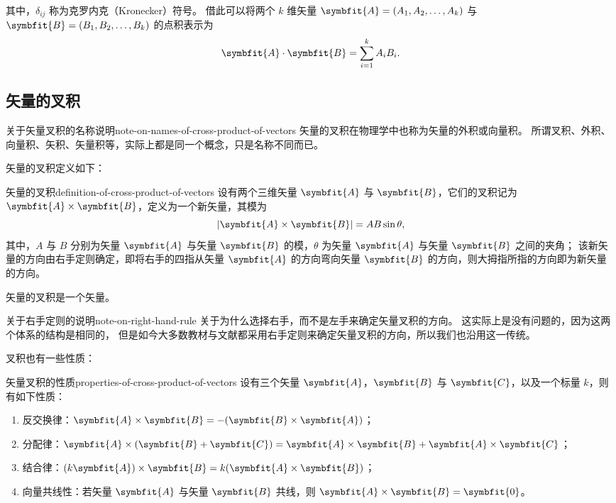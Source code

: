 其中，$ \delta_{ij} $ 称为克罗内克（Kronecker）符号。
借此可以将两个 $ k $ 维矢量 $ \symbfit{A} = (A_1 , A_2 , \ldots , A_k) $ 与 $ \symbfit{B} = (B_1 , B_2 , \ldots , B_k) $ 的点积表示为
\begin{equation}
    \symbfit{A} \cdot \symbfit{B} = \sum_{i=1}^{k} A_i B_i .
\end{equation}

\subsection{矢量的叉积}\label{subsec:cross-product-of-vectors}
\begin{note}{关于矢量叉积的名称说明}{note-on-names-of-cross-product-of-vectors}
    矢量的叉积在物理学中也称为矢量的外积或向量积。
    所谓叉积、外积、向量积、矢积、矢量积等，实际上都是同一个概念，只是名称不同而已。
\end{note}
矢量的叉积定义如下：
\begin{definition}{矢量的叉积}{definition-of-cross-product-of-vectors}
    设有两个三维矢量 $ \symbfit{A} $ 与 $ \symbfit{B} $，它们的叉积记为 $ \symbfit{A} \times \symbfit{B} $，定义为一个新矢量，其模为
    \begin{equation}
        |\symbfit{A} \times \symbfit{B}| = AB \sin \theta ,
    \end{equation}
    其中，$ A $ 与 $ B $ 分别为矢量 $ \symbfit{A} $ 与矢量 $ \symbfit{B} $ 的模，$ \theta $ 为矢量 $ \symbfit{A} $ 与矢量 $ \symbfit{B} $ 之间的夹角；
    该新矢量的方向由右手定则确定，即将右手的四指从矢量 $ \symbfit{A} $ 的方向弯向矢量 $ \symbfit{B} $ 的方向，则大拇指所指的方向即为新矢量的方向。
\end{definition}
矢量的叉积是一个矢量。

\begin{note}{关于右手定则的说明}{note-on-right-hand-rule}
    关于为什么选择右手，而不是左手来确定矢量叉积的方向。
    这实际上是没有问题的，因为这两个体系的结构是相同的，
    但是如今大多数教材与文献都采用右手定则来确定矢量叉积的方向，所以我们也沿用这一传统。
\end{note}

叉积也有一些性质：
\begin{theorem}{矢量叉积的性质}{properties-of-cross-product-of-vectors}
    设有三个矢量 $ \symbfit{A} $，$ \symbfit{B} $ 与 $ \symbfit{C} $，以及一个标量 $ k $，则有如下性质：
    \begin{enumerate}
        \item 反交换律：$ \symbfit{A} \times \symbfit{B} = - (\symbfit{B} \times \symbfit{A}) $；
        \item 分配律：$ \symbfit{A} \times (\symbfit{B} + \symbfit{C}) = \symbfit{A} \times \symbfit{B} + \symbfit{A} \times \symbfit{C} $；
        \item 结合律：$ (k \symbfit{A}) \times \symbfit{B} = k (\symbfit{A} \times \symbfit{B}) $；
        \item 向量共线性：若矢量 $ \symbfit{A} $ 与矢量 $ \symbfit{B} $ 共线，则 $ \symbfit{A} \times \symbfit{B} = \symbfit{0} $。
    \end{enumerate}
\end{theorem}

